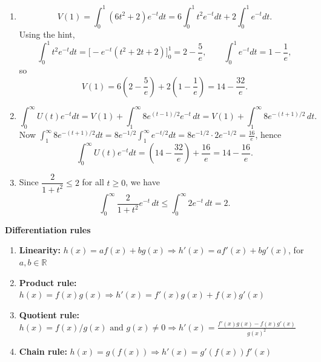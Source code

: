 \documentclass[11pt]{exam}
\newcommand{\R}{\mathbb{R}}
\begin{document}
\begin{questions}
\begin{solution}[0cm]
\begin{enumerate}[leftmargin = 0.5cm, label = (\alph*), rightmargin = 0.2cm]
\item
\[
V(1)=\int_0^1 (6t^2+2)e^{-t}dt
=6\int_0^1 t^2e^{-t}dt + 2\int_0^1 e^{-t}dt.
\]
Using the hint,
\[
\int_0^1 t^2e^{-t}dt=\bigl[-e^{-t}(t^2+2t+2)\bigr]_0^1=2-\frac{5}{e},\qquad
\int_0^1 e^{-t}dt=1-\frac{1}{e},
\]
so
\[
V(1)=6\left(2-\frac{5}{e}\right)+2\left(1-\frac{1}{e}\right)=14-\frac{32}{e}.
\]

\item
\[
\int_0^\infty U(t)e^{-t}dt
=V(1)+\int_1^\infty 8e^{(t-1)/2}e^{-t}\,dt
=V(1)+\int_1^\infty 8e^{-(t+1)/2}\,dt.
\]
Now $\int_1^\infty 8e^{-(t+1)/2}dt=8e^{-1/2}\int_1^\infty e^{-t/2}dt
=8e^{-1/2}\cdot 2e^{-1/2}=\frac{16}{e}$, hence
\[
\int_0^\infty U(t)e^{-t}dt=\left(14-\frac{32}{e}\right)+\frac{16}{e}
=14-\frac{16}{e}.
\]

\item
Since $\dfrac{2}{1+t^2}\le 2$ for all $t\ge 0$, we have
\[
\int_0^\infty \frac{2}{1+t^2}e^{-t}\,dt \le \int_0^\infty 2e^{-t}\,dt = 2.
\]

\end{enumerate}
\end{solution}

\end{questions}

\begin{center}
    \textbf{Differentiation rules}
\end{center}
        
        \begin{enumerate}[leftmargin = 0.5cm, label = , rightmargin = 0.2cm]

        \item \textbf{Linearity:} $h(x) = a f(x) + b g(x) \Longrightarrow h'(x) = a f'(x) + b g'(x)$, for $a, b \in\R$

        \item \textbf{Product rule:} $h(x) = f(x)g(x) \Longrightarrow h'(x) = f'(x)g(x) + f(x)g'(x)$

        \item \textbf{Quotient rule:} $h(x) = f(x)/g(x) \text{ and } g(x) \neq 0 \Longrightarrow h'(x) = \frac{f'(x)g(x) - f(x)g'(x)}{g(x)^2}$

        \item \textbf{Chain rule:} $h(x) = g(f(x)) \Longrightarrow h'(x) = g'(f(x))f'(x)$
        
        \end{enumerate}
        
\end{document}
